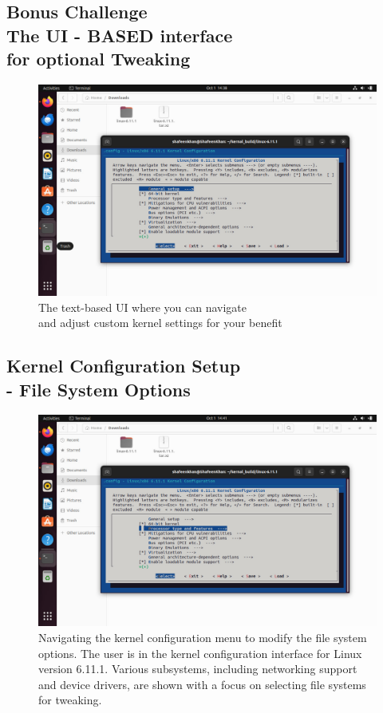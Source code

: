 \documentclass{article}
\begin{document}
\subsection{Bonus Challenge \\The UI - BASED interface \\for optional Tweaking }
\begin{figure}[H]
    \centering
    \includegraphics[width=0.8\linewidth]{61.jpg}
    \caption{The text-based UI where you can navigate\\ and adjust custom kernel settings for your benefit}
\end{figure}

\subsection{Kernel Configuration Setup \\- File System Options}
\begin{figure}[H]
    \centering
    \includegraphics[width=0.8\linewidth]{60.jpg}
    \caption{Navigating the kernel configuration menu to modify the file system options. The user is in the kernel configuration interface for Linux version 6.11.1. Various subsystems, including networking support and device drivers, are shown with a focus on selecting file systems for tweaking.}
\end{figure}
\end{document}
